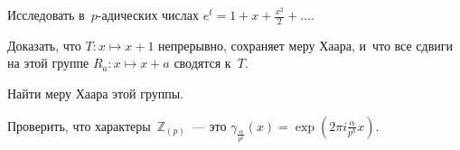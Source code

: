 \documentclass{article}
\begin{document}
\begin{exercise}[$\ast\ast$]
	Исследовать в~$p$-адических числах $e^t = 1 + x + \frac{x^2}{2} + \ldots$.
\end{exercise}

\begin{exercise}
	Доказать, что $T: x \mapsto x + 1$ непрерывно, сохраняет меру Хаара, и~что все
	сдвиги на этой группе $R_a: x \mapsto x + a$ сводятся к~$T$.
\end{exercise}

\begin{exercise}
	Найти меру Хаара этой группы.
\end{exercise}

\begin{exercise}
	Проверить, что характеры~$\mathbb{Z}_{(p)}$~--- это
	$\gamma_{\frac{\alpha}{p^k}}(x) = \exp(2\pi i \frac{\alpha}{p^k}x)$.
\end{exercise}
\end{document}

